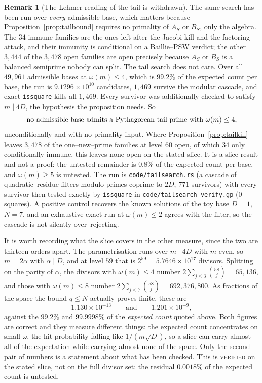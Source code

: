 \documentclass[11pt]{article}
\theoremstyle{definition}
\newtheorem{remark}[theorem]{Remark}
\begin{document}
\begin{remark}[The Lehmer reading of the tail is withdrawn]
The same search has been run over \emph{every} admissible base, which matters because
Proposition~\ref{prop:tailbound} requires no primality of $A_S$ or $B_S$, only the algebra. The $34$
immune families are the ones left after the Jacobi kill and the factoring attack, and their immunity
is conditional on a Baillie--PSW verdict; the other $3{,}444$ of the $3{,}478$ open families are open
precisely because $A_S$ or $B_S$ is a balanced semiprime nobody can split. The tail search does not
care. Over all $49{,}961$ admissible bases at $\omega(m)\le4$, which is $99.2\%$ of the expected count
per base, the run is $9.1296\times10^{10}$ candidates, $1{,}469$ survive the modular cascade, and
exact \texttt{issquare} kills all $1{,}469$. Every survivor was additionally checked to satisfy
$m\mid 4D$, the hypothesis the proposition needs. So
\[ \textup{no admissible base admits a Pythagorean tail prime with }\omega(m)\le4, \]
unconditionally and with no primality input. Where Proposition~\ref{prop:tailkill} leaves $3{,}478$
of the one--new--prime families at level $60$ open, of which $34$ only conditionally immune, this
leaves none open on the stated slice. It is a slice result and not a proof: the untested remainder is
$0.8\%$ of the expected count per base, and $\omega(m)\ge5$ is untested.
The run is \texttt{code/tailsearch.rs} (a cascade of quadratic--residue filters modulo primes coprime
to $2D$, $771$ survivors) with every survivor then tested exactly by \texttt{issquare} in
\texttt{code/tailsearch\_verify.gp} ($0$ squares). A positive control recovers the known solutions of
the toy base $D=1$, $N=7$, and an exhaustive exact run at $\omega(m)\le2$ agrees with the filter, so
the cascade is not silently over--rejecting.

It is worth recording what the slice covers in the other measure, since the two are thirteen orders
apart. The parametrisation runs over $m\mid4D$ with $m$ even, so $m=2\alpha$ with $\alpha\mid D$, and
at level $59$ that is $2^{59}=5.7646\times10^{17}$ divisors. Splitting on the parity of $\alpha$, the
divisors with $\omega(m)\le4$ number $2\sum_{j\le3}\binom{58}{j}=65{,}136$, and those with
$\omega(m)\le8$ number $2\sum_{j\le7}\binom{58}{j}=692{,}376{,}800$. As fractions of the space the
bound $q\le N$ actually proves finite, these are
\[ 1.130\times10^{-13}\qquad\text{and}\qquad 1.201\times10^{-9}, \]
against the $99.2\%$ and $99.9998\%$ of the \emph{expected count} quoted above. Both figures are
correct and they measure different things: the expected count concentrates on small $\omega$, the hit
probability falling like $1/(m\sqrt D)$, so a slice can carry almost all of the expectation while
carrying almost none of the space. Only the second pair of numbers is a statement about what has
been checked. This is \textsc{verified} on the stated slice, not on the
full divisor set: the residual $0.0018\%$ of the expected count is untested.


\end{remark}
\end{document}
